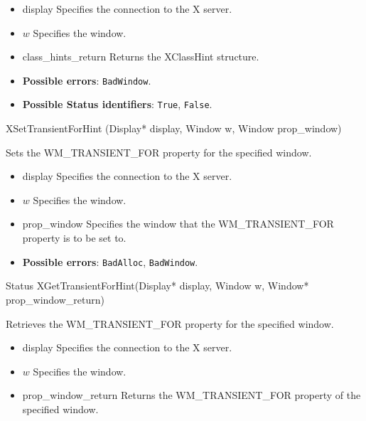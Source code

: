 \documentclass{report}
\begin{document}
\begin{itemize}
            \begin{itemize}
                \item display Specifies the connection to the X server.
                \item $w$ Specifies the window.
                \item class\_hints\_return Returns the XClassHint structure.
            \end{itemize}

            \begin{itemize}
                \item \textbf{Possible errors}: \texttt{BadWindow}.
                \item \textbf{Possible Status identifiers}: \texttt{True}, \texttt{False}.
            \end{itemize}

            \begin{cppcode}
            XSetTransientForHint (Display* display, Window w, Window prop_window)
            \end{cppcode}
            \bigbreak \noindent
            Sets the WM\_TRANSIENT\_FOR property for the specified window.

            \begin{itemize}
                \item display Specifies the connection to the X server.
                \item $w$ Specifies the window.
                \item prop\_window Specifies the window that the WM\_TRANSIENT\_FOR property is to be set to.
            \end{itemize}

            \begin{itemize}
                \item \textbf{Possible errors}: \texttt{BadAlloc}, \texttt{BadWindow}.
            \end{itemize}

            \begin{cppcode}
                Status XGetTransientForHint(Display* display, Window w, Window* prop\_window\_return)
            \end{cppcode}
            \bigbreak \noindent
            Retrieves the WM\_TRANSIENT\_FOR property for the specified window.

            \begin{itemize}
                \item display Specifies the connection to the X server.
                \item $w$ Specifies the window.
                \item prop\_window\_return Returns the WM\_TRANSIENT\_FOR property of the specified window.
            \end{itemize}


\end{itemize}
\end{document}
